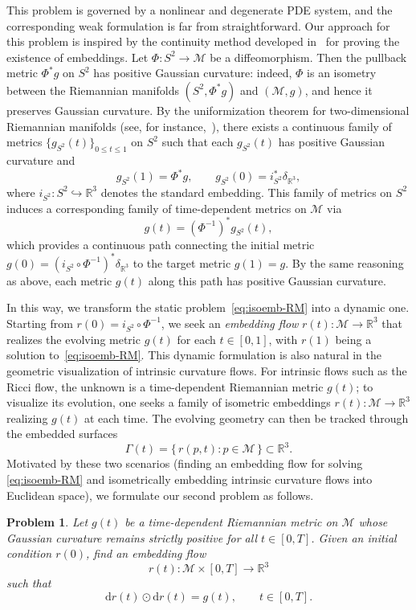 \documentclass[11pt,a4paper,oneside,reqno]{amsart}
\theoremstyle{definition}
\theoremstyle{plain}
\newtheorem{problem}{Problem}
\numberwithin{theorem}{section}
\numberwithin{proposition}{section}
\numberwithin{lemma}{section}
\numberwithin{equation}{section}
\newcommand{\Man}{\mathcal{M}}
\begin{document}
This problem is governed by a nonlinear and degenerate PDE system, and the corresponding weak formulation is far from straightforward.
Our approach for this problem is inspired by the continuity method developed in~\cite{Nirenberg1953,han2006isometric} for proving the existence of embeddings.
Let \( \Phi : S^2 \to \Man \) be a diffeomorphism. Then the pullback metric \( \Phi^* g \) on \( S^2 \) has positive Gaussian curvature: indeed, \( \Phi \) is an isometry between the Riemannian manifolds \( (S^2, \Phi^* g) \) and \( (\Man, g) \), and hence it preserves Gaussian curvature.
By the uniformization theorem for two-dimensional Riemannian manifolds (see, for instance,~\cite[Lemma~9.1.4]{han2006isometric}), there exists a continuous family of metrics
\(
\{ g_{S^2}(t) \}_{0 \le t \le 1}
\)
on \( S^2 \) such that each \( g_{S^2}(t) \) has positive Gaussian curvature and
\[
g_{S^2}(1) = \Phi^* g,
\qquad
g_{S^2}(0) = i_{S^2}^* \delta_{\mathbb{R}^3},
\]
where \( i_{S^2} : S^2 \hookrightarrow \mathbb{R}^3 \) denotes the standard embedding.
This family of metrics on \( S^2 \) induces a corresponding family of time-dependent metrics on \( \Man \) via
\[
g(t) = (\Phi^{-1})^* g_{S^2}(t),
\]
which provides a continuous path connecting the initial metric
\(
g(0) = (i_{S^2} \circ \Phi^{-1})^* \delta_{\mathbb{R}^3}
\)
to the target metric \( g(1) = g \). By the same reasoning as above, each metric \( g(t) \) along this path has positive Gaussian curvature.




In this way, we transform the static problem~\eqref{eq:isoemb-RM} into a dynamic one.
Starting from \( r(0)= i_{S^2}\circ \Phi^{-1} \), we seek an \emph{embedding flow}
\( r(t): \Man \to \mathbb{R}^3 \) that realizes the evolving metric \( g(t) \) for each \( t \in [0,1] \), with \( r(1) \) being a solution to~\eqref{eq:isoemb-RM}.
This dynamic formulation is also natural in the geometric visualization of intrinsic curvature flows.
For intrinsic flows such as the Ricci flow, the unknown is a time-dependent Riemannian metric \( g(t) \);
to visualize its evolution, one seeks a family of isometric embeddings \( r(t): \Man \to \mathbb{R}^3 \) realizing \( g(t) \) at each time.
The evolving geometry can then be tracked through the embedded surfaces
\[
\Gamma(t)=\{\, r(p,t): p\in\Man \,\}\subset \mathbb{R}^3 .
\]
Motivated by these two scenarios (finding an embedding flow for solving \eqref{eq:isoemb-RM} and isometrically embedding intrinsic curvature flows into Euclidean space), we formulate our second problem as follows.
\begin{problem}\label{Pro:dynamic}
Let \( g(t) \) be a time-dependent Riemannian metric on \( \Man \) whose Gaussian curvature remains strictly positive for all \( t\in[0,T] \).
Given an initial condition \( r(0) \), find an embedding flow
\[
r(t): \Man\times[0,T]\to\mathbb{R}^3
\]
such that
\begin{equation}\label{eq:isoemb}
\mathrm{d}r(t)\odot \mathrm{d}r(t)=g(t),\qquad t\in[0,T].
\end{equation}
\end{problem}
\end{document}
